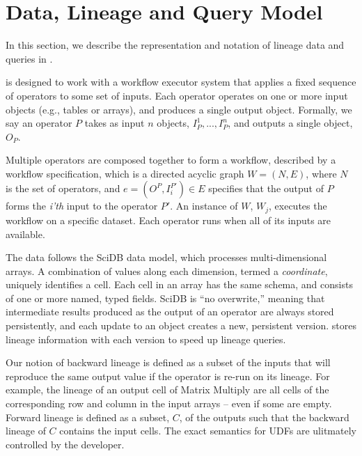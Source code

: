 \section{Data, Lineage and Query Model}
\label{s:datamodel}

In this section, we describe the representation and notation of lineage 
data and queries in \sys{}.

\sys{} is designed to work with a workflow executor system that applies a fixed
sequence of operators to some set of inputs.  Each operator operates
on one or more input objects (e.g., tables or arrays), and produces a
single output object.  Formally, we say an operator $P$ takes as input
$n$ objects, $I_P^1,...,I_P^n$, and outputs a single object, $O_P$.

Multiple operators are composed together to form a workflow, described by a
workflow specification, which is a directed acyclic graph $W = (N, E)$, where
$N$ is the set of operators, and $e = (O^P, I^{P'}_i) \in E$ specifies that the
output of $P$ forms the {\it i'th} input to the operator $P'$.  An instance of
$W$, $W_j$, executes the workflow on a specific dataset. Each operator runs
when all of its inputs are available.

The data follows the SciDB data model, which processes multi-dimensional
arrays.  A combination of values along each dimension, termed a {\it
coordinate}, uniquely identifies a cell.  Each cell in an array has the same
schema, and consists of one or more named, typed fields.  SciDB is ``no
overwrite,'' meaning that intermediate results produced as the output of an
operator are always stored persistently, and each update to an object creates a
new, persistent version.  \sys{} stores lineage information
with each version to speed up lineage queries. 


Our notion of backward lineage is defined as a subset of the inputs that will
reproduce the same output value  if the operator is re-run on its lineage.  For
example, the lineage of an output cell of Matrix Multiply are all cells of the
corresponding row and column in the input arrays -- even if some are empty.
Forward lineage is defined as a subset, $C$, of the outputs such that the
backward lineage of $C$ contains the input cells.  The exact semantics for UDFs
are ulitmately controlled by the developer.





